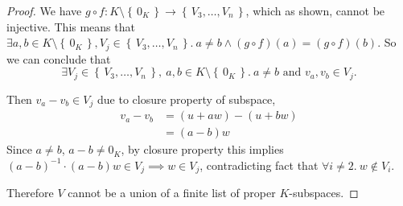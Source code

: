 \documentclass{article}
\theoremstyle{definition}
\numberwithin{equation}{problem}
\newcommand{\set}[1]{\left\{\,#1\,\right\}}
\begin{document}
\begin{proof}
    We have $g \circ f: K \setminus\set{0_K} \to \set{V_3, \dots, V_n}$, which as shown, cannot be injective.
    This means that $\exists a,b \in K \setminus\set{0_K}, V_j \in \set{V_3, \dots, V_n}.~ a \ne b \land (g\circ f)(a) = (g\circ f)(b)$. So we can conclude that 
    $$\exists V_j\in\set{V_3, \dots, V_n},~ a,b\in K\setminus\set{0_K}.~ a\ne b \text{ and } v_a, v_b\in V_j.$$

    Then $v_a - v_b \in V_j$ due to closure property of subspace,
    \begin{align*}
        v_a - v_b &= (u + aw) - (u + bw)    \\
        &= (a-b)w
    \end{align*}
    Since $a\ne b$, $a-b \ne 0_K$, by closure property this implies $(a-b)^{-1} \cdot (a-b)w \in V_j \implies w \in V_j$,
    contradicting fact that $\forall i \ne 2.~ w \notin V_i $.

    Therefore $V$ cannot be a union of a finite list of proper $K$-subspaces.
\end{proof}
\end{document}
